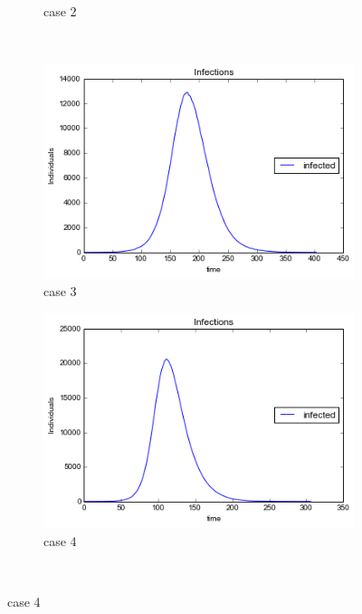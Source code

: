 \begin{figure}[!htb]
\begin{subfigure}[b]{0.3\textwidth}
        \caption{case 2}
        \label{b}
    \end{subfigure}
    ~ %
    \begin{subfigure}[b]{0.3\textwidth}
        \includegraphics[width=\textwidth]{images/2infections.png} 
        \caption{case 3}
        \label{c}
    \end{subfigure}
       \begin{subfigure}[b]{0.3\textwidth}
        \includegraphics[width=\textwidth]{images/4infections}
        \caption{case 4}
        \label{d}
    \end{subfigure}
    ~ %

\end{figure}
